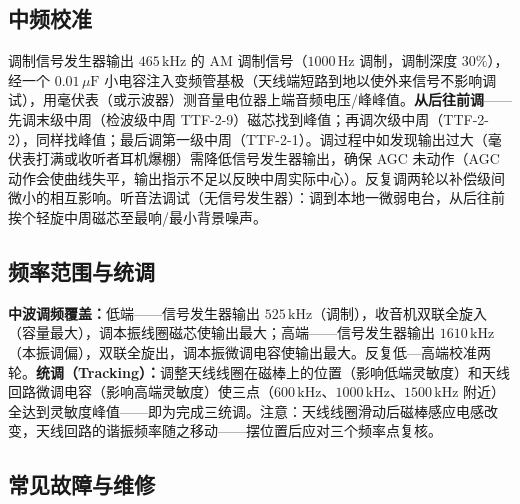 \documentclass[12pt,UTF8]{ctexbook}
\begin{document}
\subsection{中频校准}

调制信号发生器输出 $465\,\mathrm{kHz}$ 的 AM 调制信号（$1000\,\mathrm{Hz}$ 调制，调制深度 $30\%$），经一个 $0.01\,\mu\mathrm{F}$ 小电容注入变频管基极（天线端短路到地以使外来信号不影响调试），用毫伏表（或示波器）测音量电位器上端音频电压/峰峰值。\textbf{从后往前调}——先调末级中周（检波级中周 TTF-2-9）磁芯找到峰值；再调次级中周（TTF-2-2），同样找峰值；最后调第一级中周（TTF-2-1）。调过程中如发现输出过大（毫伏表打满或收听者耳机爆棚）需降低信号发生器输出，确保 AGC 未动作（AGC 动作会使曲线失平，输出指示不足以反映中周实际中心）。反复调两轮以补偿级间微小的相互影响。听音法调试（无信号发生器）：调到本地一微弱电台，从后往前挨个轻旋中周磁芯至最响/最小背景噪声。

\subsection{频率范围与统调}

\textbf{中波调频覆盖：}低端——信号发生器输出 $525\,\mathrm{kHz}$（调制），收音机双联全旋入（容量最大），调本振线圈磁芯使输出最大；高端——信号发生器输出 $1610\,\mathrm{kHz}$（本振调偏），双联全旋出，调本振微调电容使输出最大。反复低—高端校准两轮。\textbf{统调（Tracking）：}调整天线线圈在磁棒上的位置（影响低端灵敏度）和天线回路微调电容（影响高端灵敏度）使三点（$600\,\mathrm{kHz}$、$1000\,\mathrm{kHz}$、$1500\,\mathrm{kHz}$ 附近）全达到灵敏度峰值——即为完成三统调。注意：天线线圈滑动后磁棒感应电感改变，天线回路的谐振频率随之移动——摆位置后应对三个频率点复核。

\subsection{常见故障与维修}
\end{document}
